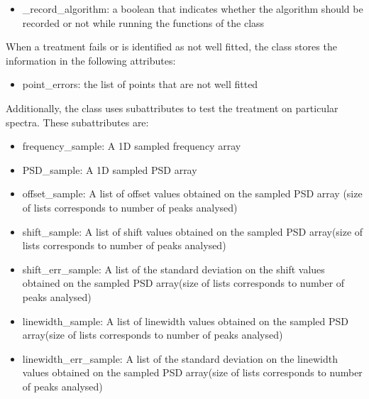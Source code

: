 \documentclass[letterpaper,10pt,english]{sphinxmanual}
\begin{document}
\begin{fulllineitems}
\begin{itemize}
\item {} 
\sphinxAtStartPar
\_record\_algorithm: a boolean that indicates whether the algorithm should be recorded or not while running the functions of the class

\end{itemize}

\sphinxAtStartPar
When a treatment fails or is identified as not well fitted, the class stores the information in the following attributes:
\begin{itemize}
\item {} 
\sphinxAtStartPar
point\_errors: the list of points that are not well fitted

\end{itemize}

\sphinxAtStartPar
Additionally, the class uses sub\sphinxhyphen{}attributes to test the treatment on particular spectra. These sub\sphinxhyphen{}attributes are:
\begin{itemize}
\item {} 
\sphinxAtStartPar
frequency\_sample: A 1\sphinxhyphen{}D sampled frequency array

\item {} 
\sphinxAtStartPar
PSD\_sample: A 1\sphinxhyphen{}D sampled PSD array

\item {} 
\sphinxAtStartPar
offset\_sample: A list of offset values obtained on the sampled PSD array (size of lists corresponds to number of peaks analysed)

\item {} 
\sphinxAtStartPar
shift\_sample: A list of shift values obtained on the sampled PSD array(size of lists corresponds to number of peaks analysed)

\item {} 
\sphinxAtStartPar
shift\_err\_sample: A list of the standard deviation on the shift values obtained on the sampled PSD array(size of lists corresponds to number of peaks analysed)

\item {} 
\sphinxAtStartPar
linewidth\_sample: A list of linewidth values obtained on the sampled PSD array(size of lists corresponds to number of peaks analysed)

\item {} 
\sphinxAtStartPar
linewidth\_err\_sample: A list of the standard deviation on the linewidth values obtained on the sampled PSD array(size of lists corresponds to number of peaks analysed)


\end{itemize}
\end{fulllineitems}
\end{document}
